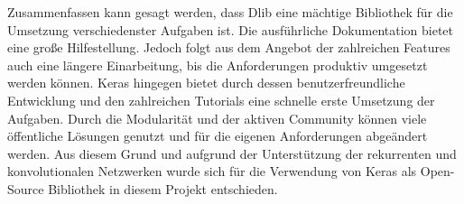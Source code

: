 \documentclass[12pt, a4paper]{scrbook}
\begin{document}
%  
Zusammenfassen kann gesagt werden, dass Dlib eine mächtige Bibliothek für die Umsetzung verschiedenster Aufgaben ist. Die ausführliche Dokumentation bietet eine große Hilfestellung. Jedoch folgt aus dem Angebot der zahlreichen Features auch eine längere Einarbeitung, bis die Anforderungen produktiv umgesetzt werden können. 
\newline
Keras hingegen bietet durch dessen benutzerfreundliche Entwicklung und den zahlreichen Tutorials eine schnelle erste Umsetzung der Aufgaben. Durch die Modularität und der aktiven Community können viele öffentliche Lösungen genutzt und für die eigenen Anforderungen abgeändert werden. 
Aus diesem Grund und aufgrund der Unterstützung der rekurrenten und konvolutionalen Netzwerken wurde sich für die Verwendung von Keras als Open-Source Bibliothek in diesem Projekt entschieden.
\end{document}

